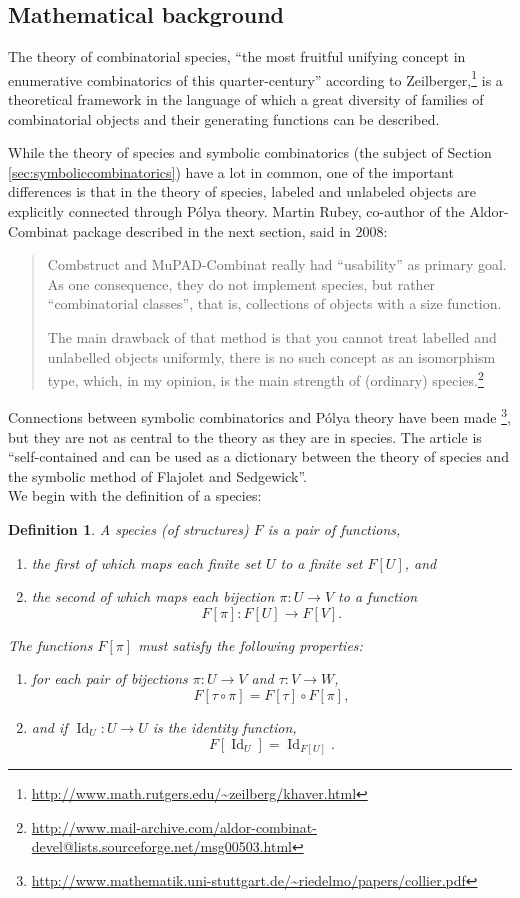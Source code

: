 \documentclass[12pt]{article}
\theoremstyle{plain}
\newtheorem{defin}{Definition}
\DeclareMathOperator{\Id}{Id}
\begin{document}
\subsection{Mathematical background}

The theory of combinatorial species,
``the most fruitful unifying concept in enumerative combinatorics of this quarter-century''
according to Zeilberger,\footnote{
 \url{http://www.math.rutgers.edu/~zeilberg/khaver.html}
}
is a theoretical framework in the language of which a great diversity of families of combinatorial objects and their generating functions can be described.

While the theory of species and symbolic combinatorics (the subject of Section \ref{sec:symboliccombinatorics}) have a lot in common, one of the important differences is that in the theory of species, labeled and unlabeled objects are explicitly connected through P\'olya theory.
Martin Rubey, co-author of the Aldor-Combinat package described in the next section, said in 2008:
\begin{quote}
Combstruct and MuPAD-Combinat really had ``usability'' as
primary goal.  As one consequence, they do not implement species, but rather
``combinatorial classes'', that is, collections of objects with a size function.

The main drawback of that method is that you cannot treat labelled and
unlabelled objects uniformly, there is no such concept as an isomorphism type,
which, in my opinion, is the main strength of (ordinary) species.\footnote{
 \url{http://www.mail-archive.com/aldor-combinat-devel@lists.sourceforge.net/msg00503.html}
}
\end{quote}
Connections between symbolic combinatorics and P\'olya theory have been made \cite{ac}%
\footnote{
 \url{http://www.mathematik.uni-stuttgart.de/~riedelmo/papers/collier.pdf}
}, but they are not as central to the theory as they are in species.
The article \cite{Salvy2011} is ``self-contained and can be used as a dictionary between the theory of species and the symbolic method of Flajolet and Sedgewick''.
\\

We begin with the definition of a species:
\begin{defin}
A \emph{species (of structures)} \( F \) is a pair of functions,
\begin{enumerate}
 \item the first of which maps each finite set \(U\) to a finite set \(F[U]\), and
 \item the second of which maps each bijection \( \pi: U \rightarrow V \) to a function
\[ F[\pi]:F[U] \rightarrow F[V]. \]
\end{enumerate}
The functions \( F[\pi] \) must satisfy the following properties:
\begin{enumerate}
 \item for each pair of bijections \( \pi : U \rightarrow V \) and \( \tau : V \rightarrow W \),
\[ F[\tau \circ \pi] = F[\tau] \circ F[\pi] , \]
 \item and if \(\Id_U : U \rightarrow U\) is the identity function,
\[ F[\Id_U] = \Id_{F[U]}.\]
\end{enumerate}
\end{defin}
\end{document}
